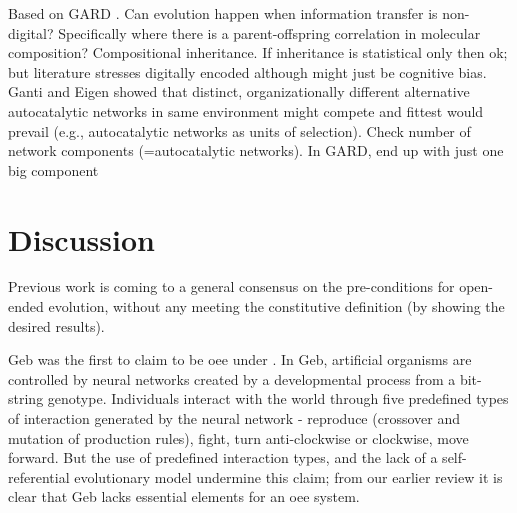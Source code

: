 \parencite{Vasas2015, Vasas2012, Vasas2012a}
Based on GARD \parencite{Segre1998}. Can evolution happen when information transfer is non-digital? Specifically where there is a parent-offspring correlation in molecular composition? Compositional inheritance. If inheritance is statistical only then ok; but literature stresses digitally encoded although might just be cognitive bias. Ganti and Eigen showed that distinct, organizationally different alternative autocatalytic networks in same environment might compete and fittest would prevail (e.g., autocatalytic networks as units of selection).	Check number of network components (=autocatalytic networks). In GARD, end up with just one big component

%	
%

\section{Discussion}
Previous work is coming to a general consensus on the pre-conditions for open-ended evolution, without any meeting the constitutive definition (by showing the desired results).

Geb \parencite{Channon:iw,Channon:2001ly} was the first to claim to be \gls{oee} under \cite{Bedau:2000mi}. In Geb, artificial organisms are controlled by neural networks created by a developmental process from a bit-string genotype. Individuals interact with the world through five predefined types of interaction generated by the neural network - reproduce (crossover and mutation of production rules), fight, turn anti-clockwise or clockwise, move forward. But the use of predefined interaction types, and the lack of a self-referential evolutionary model undermine this claim; from our earlier review it is clear that Geb lacks essential elements for an \gls{oee} system.

